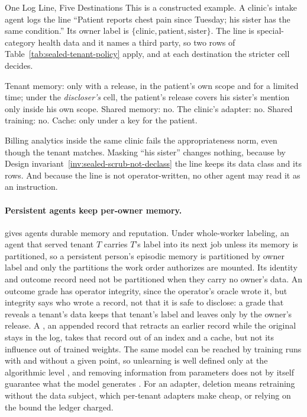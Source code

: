 \begin{pdexample}{One Log Line, Five Destinations}
\setlength{\parskip}{4pt plus 1pt}
This is a constructed example. A clinic's intake agent logs the line
``Patient reports chest pain since Tuesday; his sister has the same
condition.'' Its owner label is
$\{\text{clinic},\text{patient},\text{sister}\}$. The line is
special-category health data and it names a third party, so two rows of
Table~\ref{tab:sealed-tenant-policy} apply, and at each destination the
stricter cell decides.

Tenant memory: only with a release, in the patient's own scope and for a
limited time; under the \emph{discloser's} cell, the patient's release covers
his sister's mention only inside his own scope. Shared memory: no. The clinic's adapter: no. Shared training:
no. Cache: only under a key for the patient.

Billing analytics inside the same clinic fails the appropriateness norm, even
though the tenant matches. Masking ``his sister'' changes nothing, because by
Design invariant~\ref{inv:sealed-scrub-not-declass} the line keeps its data
class and its rows. And because the line is not operator-written, no other
agent may read it as an instruction.
\end{pdexample}

\paragraph{Persistent agents keep per-owner memory.}
 gives agents durable memory and
reputation. Under whole-worker labeling, an agent that served tenant $T$
carries $T$'s label into its next job unless its memory is partitioned, so a
persistent person's episodic memory is partitioned by owner label and only
the partitions the work order authorizes are mounted. Its identity and
outcome record need not be partitioned when they carry no owner's data. An
outcome grade has operator integrity, since the operator's oracle wrote it,
but integrity says who wrote a record, not that it is safe to disclose: a
grade that reveals a tenant's data keeps that tenant's label and leaves only
by the owner's release. A , an appended record that
retracts an earlier record while the original stays in the log, takes that
record out of an index and a cache, but not its influence out of trained
weights. The same model can be reached by training runs with and without a
given point, so unlearning is well defined only at the algorithmic level
, and removing information from parameters does
not by itself guarantee what the model generates .
For an adapter, deletion means retraining without the data subject, which
per-tenant adapters make cheap, or relying on the bound the ledger charged.


